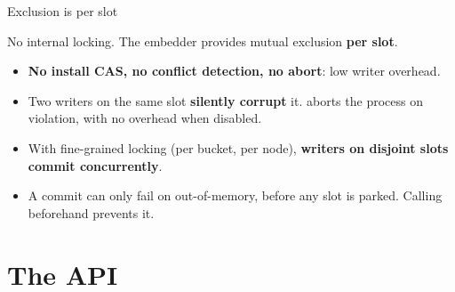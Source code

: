 \documentclass[aspectratio=169, 10pt, t, xcolor=table]{beamer}
\def\kickertext{}
\newcommand{\talksection}[1]{\section{#1}\gdef\kickertext{#1}}
\newcommand{\lead}[1]{{\large #1\par}}
\begin{document}
\begin{frame}{Exclusion is per slot}
\lead{No internal locking. The embedder provides mutual exclusion
\textbf{per slot}.}
\vspace{4mm}
\begin{itemize}
\item \textbf{No install CAS, no conflict detection, no abort}: low writer
      overhead.
\item Two writers on the same slot \textbf{silently corrupt} it.
       aborts the process on violation,
      with no overhead when disabled.
\item With fine-grained locking (per bucket, per node), \textbf{writers on
      disjoint slots commit concurrently}.
\item A commit can only fail on out-of-memory, before any slot is parked.
      Calling  beforehand prevents it.
\end{itemize}
\label{fr:exclusion}
\end{frame}

\talksection{The API}
\end{document}
